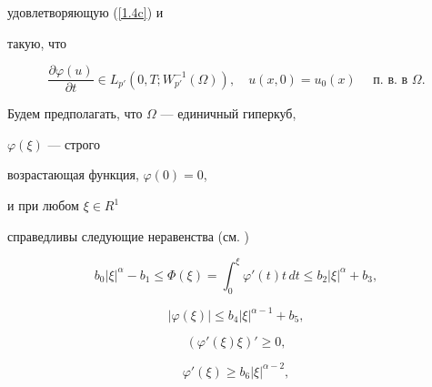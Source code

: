  удовлетворяющую (\ref{1.4c}) и


 такую, что


%


\begin{equation}\label{1.3c}


 \frac{\partial\varphi (u)}{\partial t}\in


L_{p'} ( 0,T; W^{-1}_{p'} ( \Omega ) ),\quad


u(x,0) = u_{0}(x)\quad \text{ п.~в. в }\Omega. 


\end{equation}


%





Будем предполагать, что $\Omega$ --- единичный гиперкуб,


$\varphi (\xi )$ --- строго


возрастающая функция, $ \varphi (0) = 0 $,


и при любом $ \xi  \in  R^{1} $


справедливы следующие неравенства (см. \cite{N})


%


\begin{equation}\label{(1.3)}


b_{0} | \xi |^{\alpha }- b_{1} \le


 \Phi (\xi )=\int^{\xi }_{0}\varphi '(t) t\, dt \le


  b_{2}|\xi |^{\alpha }+b_{3},


\end{equation}


%


\begin{equation}\label{(1.4)}


| \varphi  (\xi )|  \le


b_{4}| \xi | ^{\alpha-1 }+ b_{5},


\end{equation}


%


\begin{equation}


(\varphi ' (\xi ) \xi )' \ge 0,


\label{(1.5)}


\end{equation}


%


\begin{equation}


 \varphi ' (\xi ) \ge b_{6} | \xi |^{\alpha -2 },


\label{*}


\end{equation}


